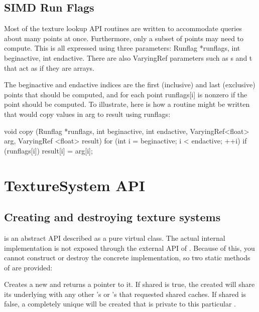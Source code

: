 \subsection{SIMD Run Flags}

Most of the texture lookup API routines are written to accommodate
queries about many points at once.  Furthermore, only a subset of
points may need to compute.  This is all expressed using three
parameters:  {\cf Runflag *runflags, int beginactive, int endactive}.
There are also {\cf VaryingRef} parameters such as {\cf s} and {\cf t}
that act as if they are arrays.

The {\cf beginactive} and {\cf endactive} indices are the first
(inclusive) and
last (exclusive) points that should be computed, and for each point
{\cf runflags[i]} is nonzero if the point should be computed.  To
illustrate, here is how a routine might be written that would copy
values in {\cf arg} to {\cf result} using runflags:

\begin{code}
        void copy (Runflag *runflags, int beginactive, int endactive,
                   VaryingRef<float> arg, VaryingRef <float> result)
        {
            for (int i = beginactive; i < endactive;  ++i)
                if (runflags[i])
                    result[i] = arg[i];
        }
\end{code}


\newpage
\section{TextureSystem API}
\label{sec:texturesys:api}

\subsection{Creating and destroying texture systems}
\label{sec:texturesys:api:createdestroy}

\TextureSystem is an abstract API described as a pure
virtual class.  The actual internal implementation is not exposed
through the external API of \product.  Because of this, you cannot
construct or destroy the concrete implementation, so two static
methods of \TextureSystem are provided:

Creates a new \TextureSystem and returns a pointer to it.
If {\cf shared} is {\cf true}, the \TextureSystem created will share its
underlying \ImageCache with any other \TextureSystem's or \ImageCache's
that requested shared caches.  If {\cf shared} is {\cf false}, a
completely unique \ImageCache will be created that is private to this
particular \TextureSystem.
\apiend

